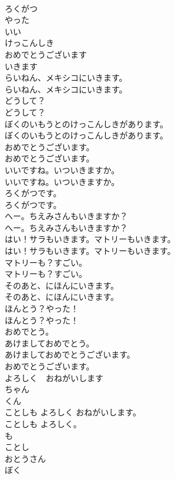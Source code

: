 \documentclass[8pt]{extreport}
\begin{document}
\begin{CJK}{UTF8}{min}
\\	ろくがつ
\\	やった
\\	いい
\\	けっこんしき
\\	おめでとうございます
\\	いきます
\\	らいねん、メキシコにいきます。	
\\	らいねん、メキシコにいきます。 
\\	どうして？	
\\	どうして？ 
\\	ぼくのいもうとのけっこんしきがあります。	
\\	ぼくのいもうとのけっこんしきがあります。 
\\	おめでとうございます。	
\\	おめでとうございます。 
\\	いいですね。いついきますか。	
\\	いいですね。いついきますか。 
\\	ろくがつです。	
\\	ろくがつです。 
\\	へー。ちえみさんもいきますか？	
\\	へー。ちえみさんもいきますか？ 
\\	はい！サラもいきます。マトリーもいきます。	
\\	はい！サラもいきます。マトリーもいきます。 
\\	マトリーも？すごい。	
\\	マトリーも？すごい。 
\\	そのあと、にほんにいきます。	
\\	そのあと、にほんにいきます。 
\\	ほんとう？やった！	
\\	ほんとう？やった！ 
\\	おめでとう。
\\	あけましておめでとう。
\\	あけましておめでとうございます。
\\	おめでとうございます。
\\	よろしく　おねがいします
\\	ちゃん
\\	くん
\\	ことしも よろしく おねがいします。
\\	ことしも よろしく。
\\	も
\\	ことし
\\	おとうさん
\\	ぼく

\end{CJK}
\end{document}
